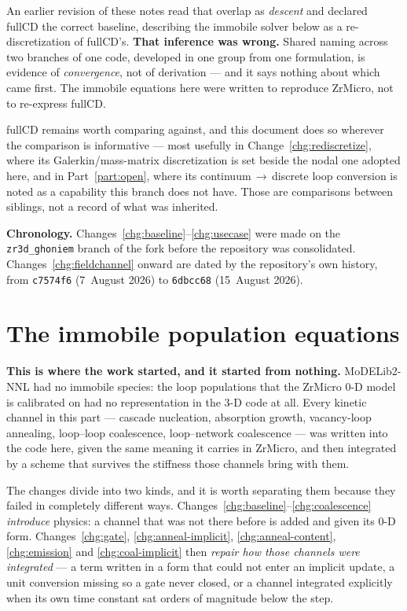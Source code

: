 \documentclass[11pt,a4paper]{article}
\newcommand{\code}[1]{\texttt{\small #1}}
\newcounter{chg}
\begin{document}
An earlier revision of these notes read that overlap as \emph{descent} and
declared fullCD the correct baseline, describing the immobile solver below as
a re-discretization of fullCD's. \textbf{That inference was wrong.} Shared
naming across two branches of one code, developed in one group from one
formulation, is evidence of \emph{convergence}, not of derivation --- and it
says nothing about which came first. The immobile equations here were written
to reproduce ZrMicro, not to re-express fullCD.

fullCD remains worth comparing against, and this document does so wherever the
comparison is informative --- most usefully in
Change~\ref{chg:rediscretize}, where its Galerkin/mass-matrix discretization
is set beside the nodal one adopted here, and in Part~\ref{part:open}, where
its continuum\,$\rightarrow$\,discrete loop conversion is noted as a
capability this branch does not have. Those are comparisons between siblings,
not a record of what was inherited.

\medskip\noindent
\textbf{Chronology.} Changes~\ref{chg:baseline}--\ref{chg:usecase} were made
on the \code{zr3d\_ghoniem} branch of the fork before the repository was
consolidated. Changes~\ref{chg:fieldchannel} onward are dated by the
repository's own history, from \code{c7574f6} (7~August 2026) to
\code{6dbcc68} (15~August 2026).

\part{The immobile population equations}
\label{part:immobile}

\textbf{This is where the work started, and it started from nothing.}
MoDELib2-NNL had no immobile species: the loop populations that the ZrMicro
0-D model is calibrated on had no representation in the 3-D code at all. Every
kinetic channel in this part --- cascade nucleation, absorption growth,
vacancy-loop annealing, loop--loop coalescence, loop--network coalescence ---
was written into the code here, given the same meaning it carries in ZrMicro,
and then integrated by a scheme that survives the stiffness those channels
bring with them.

The changes divide into two kinds, and it is worth separating them because
they failed in completely different ways.
Changes~\ref{chg:baseline}--\ref{chg:coalescence} \emph{introduce} physics: a
channel that was not there before is added and given its 0-D form.
Changes~\ref{chg:gate}, \ref{chg:anneal-implicit}, \ref{chg:anneal-content},
\ref{chg:emission} and \ref{chg:coal-implicit} then \emph{repair how those
channels were integrated} --- a term written in a form that could not enter an
implicit update, a unit conversion missing so a gate never closed, or a
channel integrated explicitly when its own time constant sat orders of
magnitude below the step.
\end{document}
